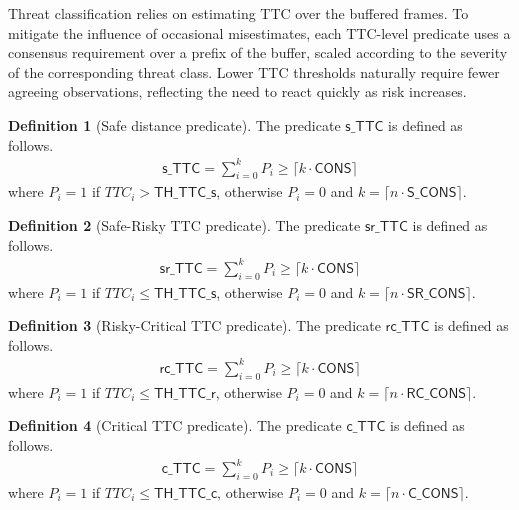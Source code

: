 \documentclass[journal]{IEEEtran}
\theoremstyle{definition}
\newtheorem{definition}{Definition}
\theoremstyle{property}
\newcommand{\thr}[1]{\mathsf{#1}}
\newcommand{\sd}{\mathsf{s\_TTC}}
\newcommand{\srd}{\mathsf{sr\_TTC}}
\newcommand{\rcd}{\mathsf{rc\_TTC}}
\newcommand{\cd}{\mathsf{c\_TTC}}
\begin{document}
Threat classification relies on estimating TTC over the buffered frames. To mitigate the influence of occasional misestimates, each TTC-level predicate uses a consensus requirement over a prefix of the buffer, scaled according to the severity of the corresponding threat class. Lower TTC thresholds naturally require fewer agreeing observations, reflecting the need to react quickly as risk increases.

\begin{definition}[Safe distance predicate]\label{def:app_sd}
The predicate $\sd$ is defined as follows. 
\[
    \begin{aligned}
             \sd = \sum_{i=0}^{k} P_i \geq \lceil k \cdot \thr{CONS}\rceil
    \end{aligned}
\]
where $P_i = 1$ if $TTC_i > \thr{TH\_TTC\_s}$, otherwise $P_i = 0$ and $k = \lceil n \cdot \thr{S\_CONS} \rceil$.
    
\end{definition}

\begin{definition}[Safe-Risky TTC predicate]\label{def:app_srd}
The predicate $\srd$ is defined as follows. 
\[
    \begin{aligned}
             \srd = \sum_{i=0}^{k} P_i \geq \lceil k \cdot \thr{CONS}\rceil
    \end{aligned}
\]
where $P_i = 1$ if $TTC_i \leq \thr{TH\_TTC\_s}$, otherwise $P_i = 0$ and $k = \lceil n \cdot \thr{SR\_CONS} \rceil$.
    
\end{definition}

\begin{definition}[Risky-Critical TTC predicate]\label{def:app_rcd}
The predicate $\rcd$ is defined as follows. 
\[
    \begin{aligned}
             \rcd = \sum_{i=0}^{k} P_i \geq \lceil k \cdot \thr{CONS}\rceil
    \end{aligned}
\]
where $P_i = 1$ if $TTC_i \leq \thr{TH\_TTC\_r}$, otherwise $P_i = 0$ and $k = \lceil n \cdot \thr{RC\_CONS} \rceil$.
    
\end{definition}

\begin{definition}[Critical TTC predicate]\label{def:app_cdist}
The predicate $\cd$ is defined as follows. 
\[
    \begin{aligned}
             \cd = \sum_{i=0}^{k} P_i \geq \lceil k \cdot \thr{CONS}\rceil
    \end{aligned}
\]
where $P_i = 1$ if $TTC_i \leq \thr{TH\_TTC\_c}$, otherwise $P_i = 0$ and $k = \lceil n \cdot \thr{C\_CONS} \rceil$.
\end{definition}
\end{document}
